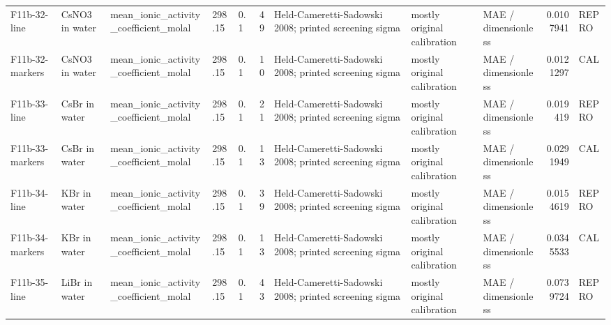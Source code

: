 \begin{landscape}
\begin{longtable}{L{1.9cm}L{2.5cm}L{2.1cm}L{1.6cm}L{1.6cm}rL{2.4cm}L{1.9cm}L{2.2cm}rL{1cm}}
F11b-\allowbreak{}32-\allowbreak{}line & CsNO3 in water & mean\_\allowbreak{}ionic\_\allowbreak{}activity\_\allowbreak{}coefficient\_\allowbreak{}molal & 298.15 & 0.1 & 49 & Held-\allowbreak{}Cameretti-\allowbreak{}Sadowski 2008; printed screening sigma & mostly original calibration & MAE /\allowbreak{} dimensionless & 0.0107941 & REPRO \\
F11b-\allowbreak{}32-\allowbreak{}markers & CsNO3 in water & mean\_\allowbreak{}ionic\_\allowbreak{}activity\_\allowbreak{}coefficient\_\allowbreak{}molal & 298.15 & 0.1 & 10 & Held-\allowbreak{}Cameretti-\allowbreak{}Sadowski 2008; printed screening sigma & mostly original calibration & MAE /\allowbreak{} dimensionless & 0.0121297 & CAL \\
F11b-\allowbreak{}33-\allowbreak{}line & CsBr in water & mean\_\allowbreak{}ionic\_\allowbreak{}activity\_\allowbreak{}coefficient\_\allowbreak{}molal & 298.15 & 0.1 & 21 & Held-\allowbreak{}Cameretti-\allowbreak{}Sadowski 2008; printed screening sigma & mostly original calibration & MAE /\allowbreak{} dimensionless & 0.019419 & REPRO \\
F11b-\allowbreak{}33-\allowbreak{}markers & CsBr in water & mean\_\allowbreak{}ionic\_\allowbreak{}activity\_\allowbreak{}coefficient\_\allowbreak{}molal & 298.15 & 0.1 & 13 & Held-\allowbreak{}Cameretti-\allowbreak{}Sadowski 2008; printed screening sigma & mostly original calibration & MAE /\allowbreak{} dimensionless & 0.0291949 & CAL \\
F11b-\allowbreak{}34-\allowbreak{}line & KBr in water & mean\_\allowbreak{}ionic\_\allowbreak{}activity\_\allowbreak{}coefficient\_\allowbreak{}molal & 298.15 & 0.1 & 39 & Held-\allowbreak{}Cameretti-\allowbreak{}Sadowski 2008; printed screening sigma & mostly original calibration & MAE /\allowbreak{} dimensionless & 0.0154619 & REPRO \\
F11b-\allowbreak{}34-\allowbreak{}markers & KBr in water & mean\_\allowbreak{}ionic\_\allowbreak{}activity\_\allowbreak{}coefficient\_\allowbreak{}molal & 298.15 & 0.1 & 13 & Held-\allowbreak{}Cameretti-\allowbreak{}Sadowski 2008; printed screening sigma & mostly original calibration & MAE /\allowbreak{} dimensionless & 0.0345533 & CAL \\
F11b-\allowbreak{}35-\allowbreak{}line & LiBr in water & mean\_\allowbreak{}ionic\_\allowbreak{}activity\_\allowbreak{}coefficient\_\allowbreak{}molal & 298.15 & 0.1 & 43 & Held-\allowbreak{}Cameretti-\allowbreak{}Sadowski 2008; printed screening sigma & mostly original calibration & MAE /\allowbreak{} dimensionless & 0.0739724 & REPRO \\

\end{longtable}
\end{landscape}
